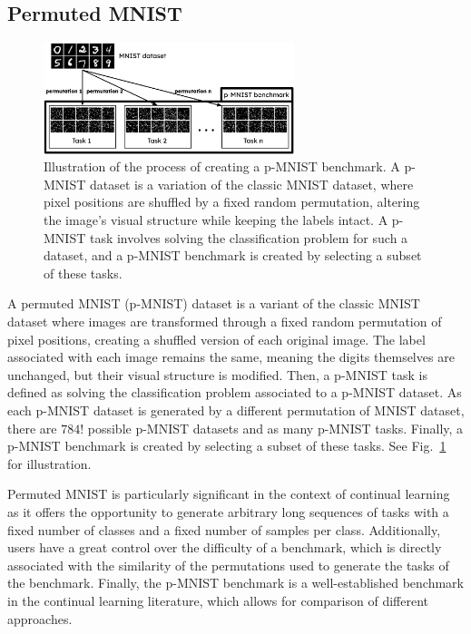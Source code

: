 \documentclass[11pt]{article}
\begin{document}
\subsection{Permuted MNIST}


\begin{figure}
    \centering
    \includegraphics[width=0.65\textwidth]{images/p-MNIST.png}
    \caption{Illustration of the process of creating a p-MNIST benchmark. A p-MNIST dataset is a variation of the classic MNIST dataset, where pixel positions are shuffled by a fixed random permutation, altering the image's visual structure while keeping the labels intact. A p-MNIST task involves solving the classification problem for such a dataset, and a p-MNIST benchmark is created by selecting a subset of these tasks.}
    \label{fig:p-MNIST}
\end{figure}

A permuted MNIST (p-MNIST) dataset \cite{pMNIST} is a variant of the classic MNIST dataset \cite{mnist} where images are transformed through a fixed random permutation of pixel positions, creating a shuffled version of each original image. The label associated with each image remains the same, meaning the digits themselves are unchanged, but their visual structure is modified. Then, a p-MNIST task is defined as solving the classification problem associated to a p-MNIST dataset. As each p-MNIST dataset is generated by a different permutation of MNIST dataset, there are $784!$ possible p-MNIST datasets and as many p-MNIST tasks. Finally, a p-MNIST benchmark is created by selecting a subset of these tasks. See Fig.~\ref{fig:p-MNIST} for illustration.

\vspace{2mm}
\noindent
Permuted MNIST is particularly significant in the context of continual learning as it offers the opportunity to generate arbitrary long sequences of tasks with a fixed number of classes and a fixed number of samples per class. Additionally, users have a great control over the difficulty of a benchmark, which is directly associated with the similarity of the permutations used to generate the tasks of the benchmark. Finally, the p-MNIST benchmark is a well-established benchmark in the continual learning literature, which allows for comparison of different approaches.
\end{document}
